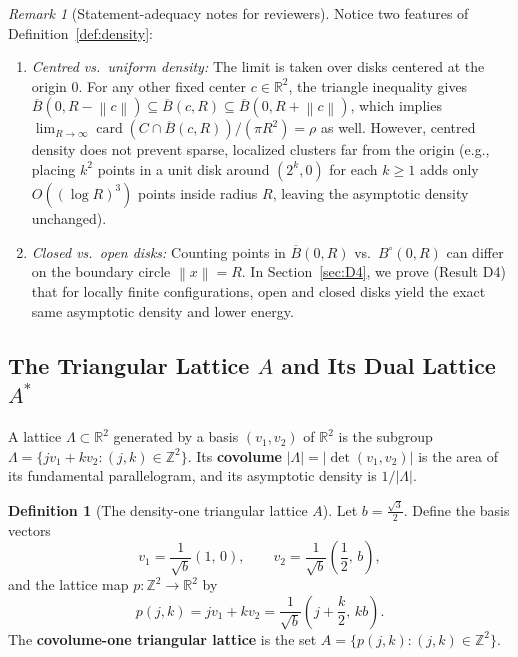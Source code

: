 \documentclass[11pt, a4paper]{article}
\theoremstyle{definition}
\newtheorem{definition}[theorem]{Definition}
\theoremstyle{remark}
\newtheorem{remark}[theorem]{Remark}
\newcommand{\R}{\mathbb{R}}
\newcommand{\Z}{\mathbb{Z}}
\newcommand{\Bbar}{\overline{B}}
\newcommand{\Bopen}{B^{\circ}}
\newcommand{\norm}[1]{\left\lVert #1 \right\rVert}
\newcommand{\abs}[1]{\left\lvert #1 \right\rvert}
\begin{document}
\begin{remark}[Statement-adequacy notes for reviewers]
Notice two features of Definition~\ref{def:density}:
\begin{enumerate}[label=(\roman*)]
    \item \textit{Centred vs.\ uniform density:} The limit is taken over disks centered at the origin $0$. For any other fixed center $c \in \R^2$, the triangle inequality gives $\Bbar(0, R - \norm{c}) \subseteq \Bbar(c, R) \subseteq \Bbar(0, R + \norm{c})$, which implies $\lim_{R \to \infty} \operatorname{card}(C \cap \Bbar(c, R))/(\pi R^2) = \rho$ as well. However, centred density does not prevent sparse, localized clusters far from the origin (e.g., placing $k^2$ points in a unit disk around $(2^k, 0)$ for each $k \ge 1$ adds only $O((\log R)^3)$ points inside radius $R$, leaving the asymptotic density unchanged).
    \item \textit{Closed vs.\ open disks:} Counting points in $\Bbar(0, R)$ vs.\ $\Bopen(0, R)$ can differ on the boundary circle $\norm{x} = R$. In Section~\ref{sec:D4}, we prove (Result D4) that for locally finite configurations, open and closed disks yield the exact same asymptotic density and lower energy.
\end{enumerate}
\end{remark}

\subsection{The Triangular Lattice $A$ and Its Dual Lattice $A^*$}

A lattice $\Lambda \subset \R^2$ generated by a basis $(v_1, v_2)$ of $\R^2$ is the subgroup $\Lambda = \{j v_1 + k v_2 : (j, k) \in \Z^2\}$. Its \textbf{covolume} $\abs{\Lambda} = \abs{\det(v_1, v_2)}$ is the area of its fundamental parallelogram, and its asymptotic density is $1/\abs{\Lambda}$.

\begin{definition}[The density-one triangular lattice $A$]
Let $b = \frac{\sqrt{3}}{2}$. Define the basis vectors
\[
v_1 = \frac{1}{\sqrt{b}}\left(1, \, 0\right), \qquad v_2 = \frac{1}{\sqrt{b}}\left(\frac{1}{2}, \, b\right),
\]
and the lattice map $p : \Z^2 \to \R^2$ by
\[
p(j, k) = j v_1 + k v_2 = \frac{1}{\sqrt{b}}\left(j + \frac{k}{2}, \, k b\right).
\]
The \textbf{covolume-one triangular lattice} is the set $A = \{p(j, k) : (j, k) \in \Z^2\}$.
\end{definition}
\end{document}
